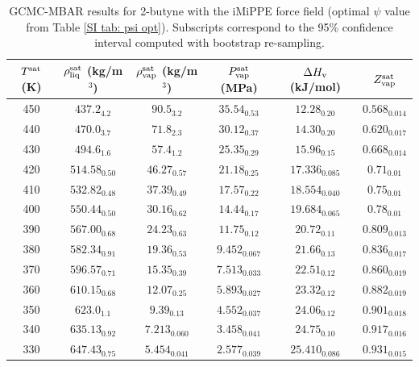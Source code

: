 \documentclass[journal=jctc,manuscript=article]{achemso}
\begin{document}
\begin{table}[htb!]
	\caption{GCMC-MBAR results for 2-butyne with the iMiPPE force field (optimal $\psi$ value from Table \ref{SI tab: psi opt}). Subscripts correspond to the 95\% confidence interval computed with bootstrap re-sampling.}
	\begin{center}
		\begin{tabular}{|c|c|c|c|c|c|}
			\hline
			$T^{\rm sat}$ (K) & $\rho_{\rm liq}^{\rm sat}$ (kg/m$^3$) & $\rho_{\rm vap}^{\rm sat}$ (kg/m$^3$) & $P_{\rm vap}^{\rm sat}$ (MPa) & $\Delta H_{\rm v}$ (kJ/mol) & $Z_{\rm vap}^{\rm sat}$ \\ \hline
			450 & $437.2_{4.2}$ & $90.5_{3.2}$ & $35.54_{0.53}$ & $12.28_{0.20}$ & $0.568_{0.014}$ \\
			440 & $470.0_{3.7}$ & $71.8_{2.3}$ & $30.12_{0.37}$ & $14.30_{0.20}$ & $0.620_{0.017}$ \\
			430 & $494.6_{1.6}$ & $57.4_{1.2}$ & $25.35_{0.29}$ & $15.96_{0.15}$ & $0.668_{0.014}$ \\
			420 & $514.58_{0.50}$ & $46.27_{0.57}$ & $21.18_{0.25}$ & $17.336_{0.085}$ & $0.71_{0.01}$ \\
			410 & $532.82_{0.48}$ & $37.39_{0.49}$ & $17.57_{0.22}$ & $18.554_{0.040}$ & $0.75_{0.01}$ \\
			400 & $550.44_{0.50}$ & $30.16_{0.62}$ & $14.44_{0.17}$ & $19.684_{0.065}$ & $0.78_{0.01}$ \\
			390 & $567.00_{0.68}$ & $24.23_{0.63}$ & $11.75_{0.12}$ & $20.72_{0.11}$ & $0.809_{0.013}$ \\
			380 & $582.34_{0.91}$ & $19.36_{0.53}$ & $9.452_{0.067}$ & $21.66_{0.13}$ & $0.836_{0.017}$ \\
			370 & $596.57_{0.71}$ & $15.35_{0.39}$ & $7.513_{0.033}$ & $22.51_{0.12}$ & $0.860_{0.019}$ \\
			360 & $610.15_{0.68}$ & $12.07_{0.25}$ & $5.893_{0.027}$ & $23.32_{0.12}$ & $0.882_{0.019}$ \\
			350 & $623.0_{1.1}$ & $9.39_{0.13}$ & $4.552_{0.037}$ & $24.06_{0.12}$ & $0.901_{0.018}$ \\
			340 & $635.13_{0.92}$ & $7.213_{0.060}$ & $3.458_{0.041}$ & $24.75_{0.10}$ & $0.917_{0.016}$ \\
			330 & $647.43_{0.75}$ & $5.454_{0.041}$ & $2.577_{0.039}$ & $25.410_{0.086}$ & $0.931_{0.015}$ \\
			\hline
		\end{tabular}
	\end{center}
\end{table}
\end{document}
